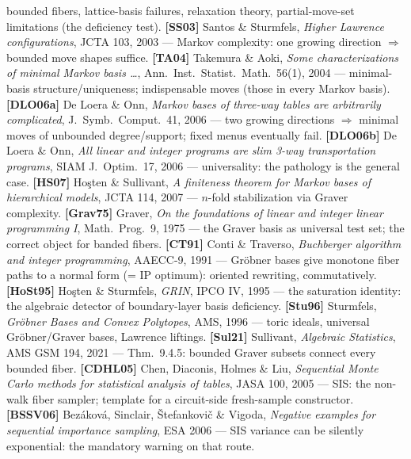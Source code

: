 \documentclass[11pt]{article}
\begin{document}
bounded fibers, lattice-basis failures, relaxation theory, partial-move-set limitations (the
deficiency test).
\textbf{[SS03]} Santos \& Sturmfels, \emph{Higher Lawrence configurations}, JCTA 103, 2003 --- Markov
complexity: one growing direction $\Rightarrow$ bounded move shapes suffice.
\textbf{[TA04]} Takemura \& Aoki, \emph{Some characterizations of minimal Markov basis \dots},
Ann.\ Inst.\ Statist.\ Math.\ 56(1), 2004 --- minimal-basis structure/uniqueness; indispensable moves
(those in every Markov basis).
\textbf{[DLO06a]} De Loera \& Onn, \emph{Markov bases of three-way tables are arbitrarily
complicated}, J.\ Symb.\ Comput.\ 41, 2006 --- two growing directions $\Rightarrow$ minimal moves of
unbounded degree/support; fixed menus eventually fail.
\textbf{[DLO06b]} De Loera \& Onn, \emph{All linear and integer programs are slim 3-way
transportation programs}, SIAM J.\ Optim.\ 17, 2006 --- universality: the pathology is the general case.
\textbf{[HS07]} Ho\c{s}ten \& Sullivant, \emph{A finiteness theorem for Markov bases of hierarchical
models}, JCTA 114, 2007 --- $n$-fold stabilization via Graver complexity.
\textbf{[Grav75]} Graver, \emph{On the foundations of linear and integer linear programming I},
Math.\ Prog.\ 9, 1975 --- the Graver basis as universal test set; the correct object for banded fibers.
\textbf{[CT91]} Conti \& Traverso, \emph{Buchberger algorithm and integer programming}, AAECC-9, 1991
--- Gr\"obner bases give monotone fiber paths to a normal form (= IP optimum): oriented rewriting,
commutatively.
\textbf{[HoSt95]} Ho\c{s}ten \& Sturmfels, \emph{GRIN}, IPCO IV, 1995 --- the saturation identity: the
algebraic detector of boundary-layer basis deficiency.
\textbf{[Stu96]} Sturmfels, \emph{Gr\"obner Bases and Convex Polytopes}, AMS, 1996 --- toric ideals,
universal Gr\"obner/Graver bases, Lawrence liftings.
\textbf{[Sul21]} Sullivant, \emph{Algebraic Statistics}, AMS GSM 194, 2021 --- Thm.~9.4.5: bounded
Graver subsets connect every bounded fiber.
\textbf{[CDHL05]} Chen, Diaconis, Holmes \& Liu, \emph{Sequential Monte Carlo methods for statistical
analysis of tables}, JASA 100, 2005 --- SIS: the non-walk fiber sampler; template for a circuit-side
fresh-sample constructor.
\textbf{[BSSV06]} Bez\'akov\'a, Sinclair, \v{S}tefankovi\v{c} \& Vigoda, \emph{Negative examples for
sequential importance sampling}, ESA 2006 --- SIS variance can be silently exponential: the mandatory
warning on that route.
\end{document}
